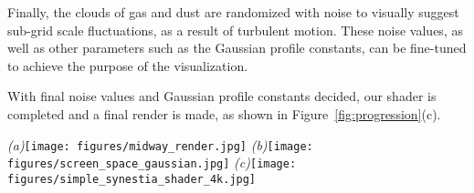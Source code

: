 \documentclass[fleqn,usenatbib,useAMS]{mnras}
\begin{document}
Finally, the clouds of gas and dust are randomized with noise to visually suggest sub-grid scale fluctuations, as a result of turbulent motion. These noise values, as well as other parameters such as the Gaussian profile constants, can be fine-tuned to achieve the purpose of the visualization. \par

With final noise values and Gaussian profile constants decided, our shader is completed and a final render is made, as shown in Figure~\ref{fig:progression}(c).
%
%




\begin{figure*}
 \begin{minipage}[c]{1.0\linewidth}
  \centering
  \begin{center}
  \textit{(a)}\texttt{[image: figures/midway\_render.jpg]}
  \textit{(b)}\texttt{[image: figures/screen\_space\_gaussian.jpg]}
  \textit{(c)}\texttt{[image: figures/simple\_synestia\_shader\_4k.jpg]}
  \caption{\textit{(a)}: This test render uses an incomplete shader, after temperature and pscale ramps are created. Visually it is evident from the color mapping that we have a redder, cooler outer region and a hotter, whiter/bluer inner region. \textit{(b)}: This test render, of the same scale and aspect ratio as \textit{(a)}, also uses an incomplete shader, but is after a screen space distance $d_{screen}$ is calculated and used in a Gaussian falloff profile for each sphere sprite. Because there is little clumping of the dust and gas clouds, randomized noise needs to added to visually suggest sub-grid scale fluctuations. \textit{(c)}: The final render, after random noise is added to complete the \texttt{Estra} shader. Because this view is distant from our areas of interest, a close-up of this same render is found in Figure~\ref{fig:Estra_AVL_render}(a).}
  \label{fig:progression}
  \end{center}
  \end{minipage}
\end{figure*}
\end{document}
